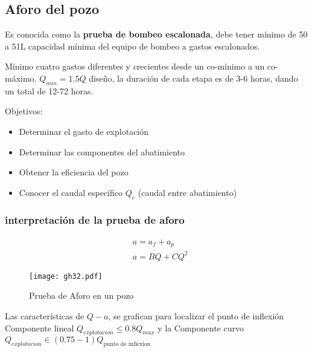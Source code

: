 
\subsection{Aforo del pozo}
Es conocida como la \textbf{prueba de bombeo escalonada}, debe tener mínimo de 50 a 51L capacidad mínima del equipo de bombeo a gastos escalonados.

Mínimo cuatro gastos diferentes y crecientes desde un co-mínimo a un co-máximo. $Q_{min}= 1.5Q$ diseño, la duración de cada etapa es de 3-6 horas, dando un total de 12-72 horas.


Objetivos:
\begin{itemize}
    \item Determinar el gasto de explotación
    \item Determinar las componentes del abatimiento
    \item Obtener la eficiencia del pozo
    \item Conocer el caudal específico $Q_e$ (caudal entre abatimiento)
\end{itemize}
\subsubsection{interpretación de la prueba de aforo}
\begin{align}
    &a = a_f + a_p\\
    &a = BQ + CQ^2
\end{align}
\begin{figure}[h!]
\centering
  \texttt{[image: gh32.pdf]}
  \caption{Prueba de Aforo en un pozo}
  \label{gh32}
\end{figure}
Las características de $Q-a$, se grafican para localizar el punto de inflexión
Componente lineal $Q_{explotacion}\leq 0.8 Q_{max}$ y la Componente curvo $Q_{explotacion}\in \left(0.75-1 \right)Q_{\text{punto de inflexion}}$


